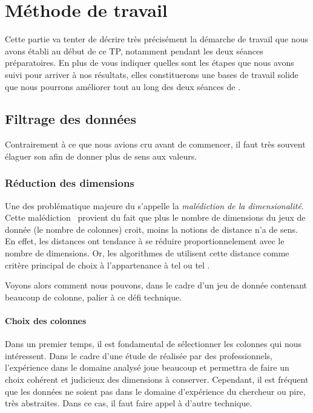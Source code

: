 \section{Méthode de travail}
Cette partie va tenter de décrire très précisément la démarche de travail que nous avons établi au début de ce TP, notamment pendant les deux séances préparatoires. En plus de vous indiquer quelles sont les étapes que nous avons suivi pour arriver à nos résultats, elles constituerons une bases de travail solide que nous pourrons améliorer tout au long des deux séances de .

\subsection{Filtrage des données}
Contrairement à ce que nous avions cru avant de commencer, il faut très souvent élaguer son  afin de donner plus de sens aux valeurs.

\subsubsection{Réduction des dimensions}
Une des problématique majeure du  s'appelle la \emph{malédiction de la dimensionalité}. Cette \og malédiction\fg~ provient du fait que plus le nombre de dimensions du jeux de donnée (\ie le nombre de colonnes) croit, moins la notions de distance n'a de sens. En effet, les distances ont tendance à se réduire proportionnelement avec le nombre de dimensions. Or, les algorithmes de  utilisent cette distance comme critère principal de choix à l'appartenance à tel ou tel .

Voyons alors comment nous pouvons, dans le cadre d'un jeu de donnée contenant beaucoup de colonne, palier à ce défi technique.
\paragraph{Choix des colonnes}
Dans un premier temps, il est fondamental de sélectionner les colonnes qui nous intéressent. Dans le cadre d'une étude de  réalisée par des professionnels, l'expérience dans le domaine analysé joue beaucoup et permettra de faire un choix cohérent et judicieux des dimensions à conserver. Cependant, il est fréquent que les données ne soient pas dans le domaine d'expérience du chercheur ou pire, très abstraites. Dans ce cas, il faut faire appel à d'autre technique.

